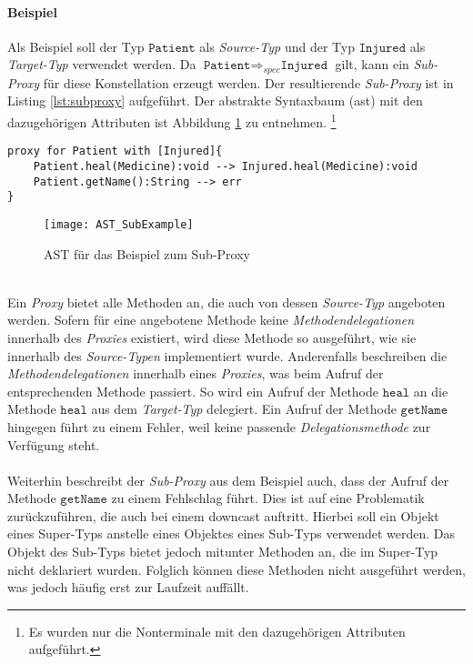 \paragraph{Beispiel}
Als Beispiel soll  der Typ $\texttt{Patient}$ als \emph{Source-Typ} und der Typ $\texttt{Injured}$ als \emph{Target-Typ} verwendet werden. Da $\texttt{Patient} \Rightarrow_{spec} \texttt{Injured}$ gilt, kann ein \emph{Sub-Proxy} für diese Konstellation erzeugt werden. Der resultierende \emph{Sub-Proxy} ist in Listing \ref{lst:subproxy} aufgeführt. Der abstrakte Syntaxbaum (\acrshort{ast}) mit den dazugehörigen Attributen ist Abbildung \ref{fig:ASTSUB} zu entnehmen. \footnote{Es wurden nur die Nonterminale mit den dazugehörigen Attributen aufgeführt.}
\begin{lstlisting}[style = dsl, caption = Sub-Proxy für Patient, captionpos = b, label = lst:subproxy]
proxy for Patient with [Injured]{
	Patient.heal(Medicine):void --> Injured.heal(Medicine):void
	Patient.getName():String --> err
}
\end{lstlisting}
\noindent
\begin{figure}[h!]
\texttt{[image: AST\_SubExample]}
\caption{AST für das Beispiel zum Sub-Proxy}
\label{fig:ASTSUB}
\end{figure}
\noindent
\\
Ein \emph{Proxy} bietet alle Methoden an, die auch von dessen \emph{Source-Typ} angeboten werden. Sofern für eine angebotene Methode keine \emph{Methodendelegationen} innerhalb des \emph{Proxies} existiert, wird diese Methode so ausgeführt, wie sie innerhalb des \emph{Source-Typen} implementiert wurde. Anderenfalls beschreiben die \emph{Methodendelegationen} innerhalb eines \emph{Proxies}, was beim Aufruf der entsprechenden Methode passiert. So wird ein Aufruf der Methode $\texttt{heal}$ an die Methode $\texttt{heal}$ aus dem \emph{Target-Typ} delegiert. Ein Aufruf der Methode $\texttt{getName}$ hingegen führt zu einem Fehler, weil keine passende \emph{Delegationsmethode} zur Verfügung steht.
\\\\
Weiterhin beschreibt der \emph{Sub-Proxy} aus dem Beispiel auch, dass der Aufruf der Methode $\texttt{getName}$ zu einem Fehlschlag führt. Dies ist auf eine Problematik zurückzuführen, die auch bei einem \Gls{downcast} auftritt. Hierbei soll ein Objekt eines Super-Typs anstelle eines Objektes eines Sub-Typs verwendet werden. Das Objekt des Sub-Typs bietet jedoch mitunter Methoden an, die im Super-Typ nicht deklariert wurden. Folglich können diese Methoden nicht ausgeführt werden, was jedoch häufig erst zur Laufzeit auffällt.
